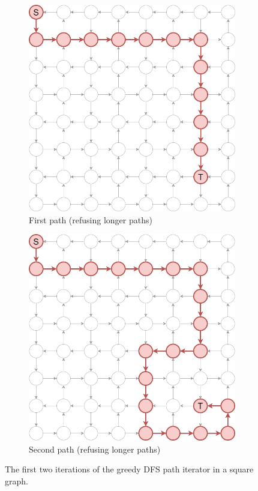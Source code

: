 \begin{figure}[ht]
\begin{subfigure}{.5\textwidth}
  \centering
\includegraphics[width=0.8\linewidth]{images/pathiterators/examples-Greedy DFS-1.png}
  \caption{First path (refusing longer paths)}
\end{subfigure}
\begin{subfigure}{.5\textwidth}
  \centering
\includegraphics[width=0.8\linewidth]{images/pathiterators/examples-Greedy DFS-reflongerpaths.png}
  \caption{Second path (refusing longer paths)}
\end{subfigure}
\caption{The first two iterations of the greedy DFS path iterator in a square graph.}
\label{fig:pathexamples-greedydfs}
\end{figure}

